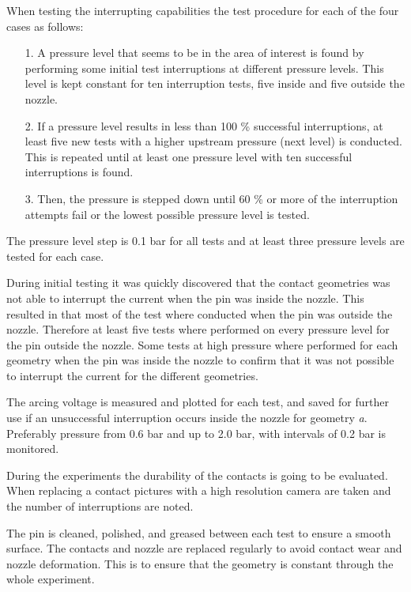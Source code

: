\documentclass[10pt,a4paper,twoside]{article}
\begin{document}
When testing the interrupting capabilities the test procedure for each of the four cases as follows: 
\begin{itemize}
\item[1.] A pressure level that seems to be in the area of interest is found by performing some initial test interruptions at different pressure levels. This level is kept constant for ten interruption tests, five inside and five outside the nozzle.
\item[2.] If a pressure level results in less than 100 \% successful interruptions, at least five new tests with a higher upstream pressure (next level) is conducted. This is repeated until at least one pressure level with ten successful interruptions is found.
\item[3.] Then, the pressure is stepped down until 60 \% or more of the interruption attempts fail or the lowest possible pressure level is tested.
\end{itemize}

The pressure level step is 0.1 bar for all tests and at least three pressure levels are tested for each case.\newline

During initial testing it was quickly discovered that the contact geometries was not able to interrupt the current when the pin was inside the nozzle. This resulted in that most of the test where conducted when the pin was outside the nozzle. Therefore at least five tests where performed on every pressure level for the pin outside the nozzle. Some tests at high pressure where performed for each geometry when the pin was inside the nozzle to confirm that it was not possible to interrupt the current for the different geometries.

The arcing voltage is measured and plotted for each test, and saved for further use if an unsuccessful interruption occurs inside the nozzle for geometry \textit{a}. Preferably pressure from 0.6 bar and up to 2.0 bar, with intervals of 0.2 bar is monitored.

During the experiments the durability of the contacts is going to be evaluated. When replacing a contact pictures with a high resolution camera are taken and the number of interruptions are noted. 

The pin is cleaned, polished, and greased between each test to ensure a smooth surface. The contacts and nozzle are replaced regularly to avoid contact wear and nozzle deformation. This is to ensure that the geometry is constant through the whole experiment.
\end{document}
